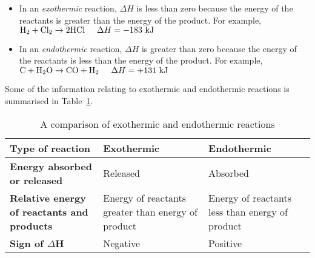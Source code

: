 \begin{itemize}
\item{In an \textit{exothermic} reaction, $\Delta H$ is less than zero because the energy of the reactants is greater than the energy of the product. For example,\\

$\text{H}_{2} + \text{Cl}_{2} \rightarrow 2\text{HCl} \hspace{.5cm} \Delta H = -183 \text{ kJ}$
}
\item{In an \textit{endothermic} reaction, $\Delta H$ is greater than zero because the energy of the reactants is less than the energy of the product. For example, \\

$\text{C} + \text{H}_{2}\text{O} \rightarrow \text{CO} + \text{H}_{2} \hspace{.5cm} \Delta H = +131 \text{ kJ}$
}
\end{itemize}

Some of the information relating to exothermic and endothermic reactions is summarised in Table~\ref{tab:energy}.


\begin{table}[h]
\begin{center}
\begin{tabular}{|p{4cm}|p{4cm}|p{4cm}|}\hline
\textbf{Type of reaction} & \textbf{Exothermic} & \textbf{Endothermic} \\\hline
\textbf{Energy absorbed or released} & Released & Absorbed \\\hline
\textbf{Relative energy of reactants and products} & Energy of reactants greater than energy of product & Energy of reactants less than energy of product \\\hline
\textbf{Sign of $\Delta$H} & Negative & Positive \\\hline
\end{tabular}
\caption{A comparison of exothermic and endothermic reactions}
\label{tab:energy}
\end{center}
\end{table}

